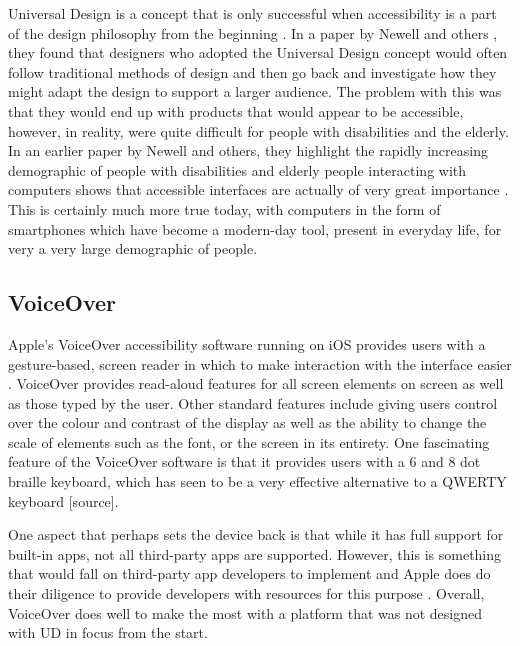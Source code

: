 Universal Design is a concept that is only successful when accessibility is a part of the design philosophy from the beginning \cite{incldesign}.
In a paper by Newell and others \cite{incldesign}, they found that designers who adopted the Universal Design concept would often follow traditional methods of design and then go back and investigate how they might adapt the design to support a larger audience.
The problem with this was that they would end up with products that would appear to be accessible, however, in reality, were quite difficult for people with disabilities and the elderly.
In an earlier paper by Newell and others, they highlight the rapidly increasing demographic of people with disabilities and elderly people interacting with computers shows that accessible interfaces are actually of very great importance \cite{computerinterface}.
This is certainly much more true today, with computers in the form of smartphones which have become a modern-day tool, present in everyday life, for very a very large demographic of people.


\subsection{VoiceOver}
Apple's VoiceOver accessibility software running on iOS provides users with a gesture-based, screen reader in which to make interaction with the interface easier \cite{iphone}.
VoiceOver provides read-aloud features for all screen elements on screen as well as those typed by the user.
Other standard features include giving users control over the colour and contrast of the display as well as the ability to change the scale of elements such as the font, or the screen in its entirety.
One fascinating feature of the VoiceOver software is that it provides users with a 6 and 8 dot braille keyboard, which has seen to be a very effective alternative to a QWERTY keyboard [source]. %

One aspect that perhaps sets the device back is that while it has full support for built-in apps, not all third-party apps are supported.
However, this is something that would fall on third-party app developers to implement and Apple does do their diligence to provide developers with resources for this purpose \cite{iphonedev}.
Overall, VoiceOver does well to make the most with a platform that was not designed with UD in focus from the start.

